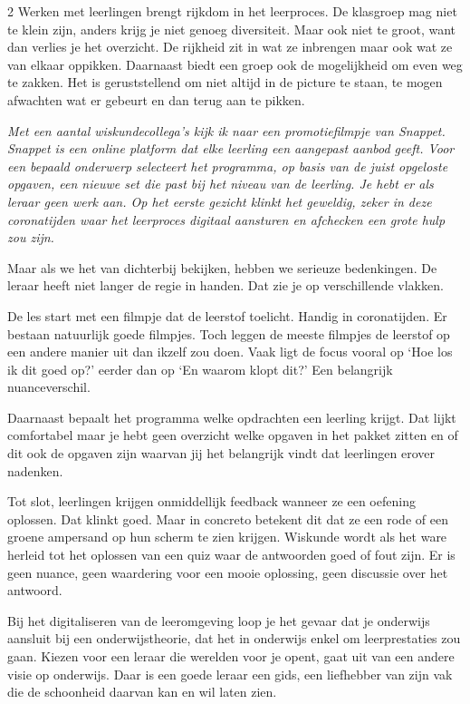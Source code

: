 \begin{multicols}{2}
Werken met leerlingen brengt rijkdom in het leerproces. De klasgroep mag niet te klein zijn, anders krijg je niet genoeg diversiteit. Maar ook niet te groot, want dan verlies je het overzicht. De rijkheid zit in wat ze inbrengen maar ook wat ze van elkaar oppikken. Daarnaast biedt een groep ook de mogelijkheid om even weg te zakken. Het is geruststellend om niet altijd in de picture te staan, te mogen afwachten wat er gebeurt en dan terug aan te pikken. 


\emph{Met een aantal wiskundecollega's kijk ik naar een promotiefilmpje van Snappet. Snappet is een online platform dat elke leerling een aangepast aanbod geeft. Voor een bepaald onderwerp selecteert het programma, op basis van de juist opgeloste opgaven, een nieuwe set die past bij het niveau van de leerling. Je hebt er als leraar geen werk aan. Op het eerste gezicht klinkt het geweldig, zeker in deze coronatijden waar het leerproces digitaal aansturen en afchecken een grote hulp zou zijn. }

Maar als we het van dichterbij bekijken, hebben we serieuze bedenkingen. De leraar heeft niet langer de regie in handen. Dat zie je op verschillende vlakken. 

De les start met een filmpje dat de leerstof toelicht. Handig in coronatijden. Er bestaan natuurlijk goede filmpjes. Toch leggen de meeste filmpjes de leerstof op een andere manier uit dan ikzelf zou doen. Vaak ligt de focus vooral op `Hoe los ik dit goed op?' eerder dan op `En waarom klopt dit?' Een belangrijk nuanceverschil.

Daarnaast bepaalt het programma welke opdrachten een leerling krijgt. Dat lijkt comfortabel maar je hebt geen overzicht welke opgaven in het pakket zitten en of dit ook de opgaven zijn waarvan jij het belangrijk vindt dat leerlingen erover nadenken.

Tot slot, leerlingen krijgen onmiddellijk feedback wanneer ze een oefening oplossen. Dat klinkt goed. Maar in concreto betekent dit dat ze een rode of een groene ampersand op hun scherm te zien krijgen. Wiskunde wordt als het ware herleid tot het oplossen van een quiz waar de antwoorden goed of fout zijn. Er is geen nuance, geen waardering voor een mooie oplossing, geen discussie over het antwoord.

Bij het digitaliseren van de leeromgeving loop je het gevaar dat je onderwijs aansluit bij een onderwijstheorie, dat het in onderwijs enkel om leerprestaties zou gaan. Kiezen voor een leraar die werelden voor je opent, gaat uit van een andere visie op onderwijs. Daar is een goede leraar een gids, een liefhebber van zijn vak die de schoonheid daarvan kan en wil laten zien.



\end{multicols}
